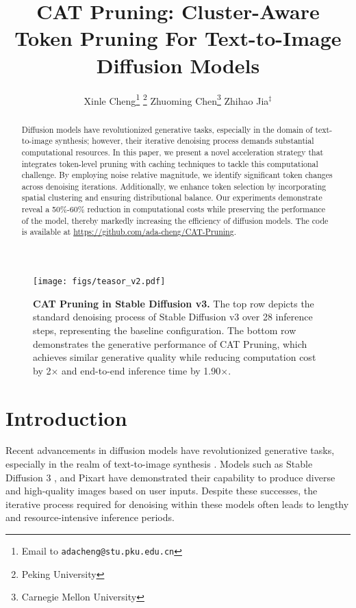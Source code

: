 \documentclass[10pt]{article}
\title{CAT Pruning: Cluster-Aware Token Pruning For Text-to-Image Diffusion Models}
\author{Xinle Cheng\thanks{ Email to \texttt{adacheng@stu.pku.edu.cn}} \thanks{Peking University} \qquad Zhuoming Chen\thanks{Carnegie Mellon University} \qquad Zhihao Jia$^\ddagger$}
\date{}
\begin{document}
\maketitle

\begin{abstract}
Diffusion models have revolutionized generative tasks, especially in the domain of text-to-image synthesis; however, their iterative denoising process demands substantial computational resources. In this paper, we present a novel acceleration strategy that integrates token-level pruning with caching techniques to tackle this computational challenge.
By employing noise relative magnitude, we identify significant token changes across denoising iterations. 
Additionally, we enhance token selection by incorporating spatial clustering and ensuring distributional balance. Our experiments demonstrate reveal a 50\%-60\% reduction in computational costs while preserving the performance of the model, thereby markedly increasing the efficiency of diffusion models. The code is available at \href{https://github.com/ada-cheng/CAT-Pruning}{https://github.com/ada-cheng/CAT-Pruning}.

\end{abstract}


\begin{figure}
    \centering
    \texttt{[image: figs/teasor\_v2.pdf]}
    \caption{\textbf{CAT Pruning in Stable Diffusion v3.} The top row depicts the standard denoising process of Stable Diffusion v3 over 28 inference steps, representing the baseline configuration. The bottom row demonstrates the generative performance of CAT Pruning, which achieves similar generative quality while reducing computation cost by 2$\times$ and end-to-end inference time by 1.90$\times$.}
    \label{fig:teasor}
\end{figure}

\section{Introduction}

Recent advancements in diffusion models \citep{ho2020denoisingdiffusionprobabilisticmodels,NEURIPS2021_49ad23d1,NEURIPS2019_3001ef25} have revolutionized generative tasks, especially in the realm of text-to-image synthesis \citep{Karras2022edm}. 
Models such as Stable Diffusion 3 \citep{esser2024scalingrectifiedflowtransformers}, and Pixart \citep{chen2023pixartalpha,chen2024pixartdelta} have demonstrated their capability to produce diverse and high-quality images based on user inputs. Despite these successes, the iterative process required for denoising within these models often leads to lengthy and resource-intensive inference periods.
\end{document}
